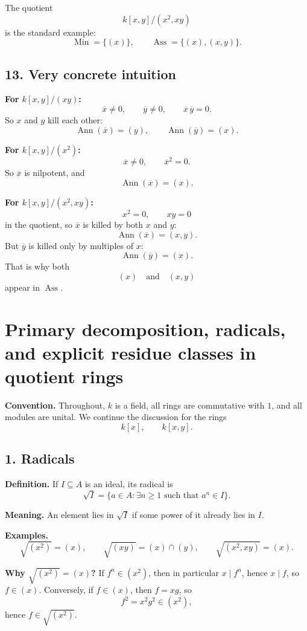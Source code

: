 \documentclass[12pt,a4paper]{article}
\theoremstyle{notespace}
\DeclareMathOperator{\Ass}{Ass}
\DeclareMathOperator{\Ann}{Ann}
\DeclareMathOperator{\Min}{Min}
\begin{document}
The quotient
\[
k[x,y]/(x^2,xy)
\]
is the standard example:
\[
\Min=\{(x)\},\qquad \Ass=\{(x),(x,y)\}.
\]

\subsection{13. Very concrete intuition}

\textbf{For \(k[x,y]/(xy)\):}
\[
\overline x\neq 0,\qquad \overline y\neq 0,\qquad \overline x\,\overline y=0.
\]
So \(x\) and \(y\) kill each other:
\[
\Ann(\overline x)=(y),\qquad \Ann(\overline y)=(x).
\]

\textbf{For \(k[x,y]/(x^2)\):}
\[
\overline x\neq 0,\qquad \overline x^2=0.
\]
So \(\overline x\) is nilpotent, and
\[
\Ann(\overline x)=(x).
\]

\textbf{For \(k[x,y]/(x^2,xy)\):}
\[
x^2=0,\qquad xy=0
\]
in the quotient, so \(\overline x\) is killed by both \(x\) and \(y\):
\[
\Ann(\overline x)=(x,y).
\]
But \(\overline y\) is killed only by multiples of \(x\):
\[
\Ann(\overline y)=(x).
\]
That is why both
\[
(x)\quad \text{and}\quad (x,y)
\]
appear in \(\Ass\).

\section{Primary decomposition, radicals, and explicit residue classes in quotient rings}

\textbf{Convention.}
Throughout, \(k\) is a field, all rings are commutative with \(1\), and all modules are unital.
We continue the discussion for the rings
\[
k[x],\qquad k[x,y].
\]

\subsection{1. Radicals}

\textbf{Definition.}
If \(I\subseteq A\) is an ideal, its radical is
\[
\sqrt{I}=\{a\in A:\exists n\ge 1\text{ such that }a^n\in I\}.
\]

\textbf{Meaning.}
An element lies in \(\sqrt I\) if some power of it already lies in \(I\).

\textbf{Examples.}
\[
\sqrt{(x^2)}=(x),\qquad \sqrt{(xy)}=(x)\cap(y),\qquad \sqrt{(x^2,xy)}=(x).
\]

\textbf{Why \(\sqrt{(x^2)}=(x)\)?}
If \(f^n\in (x^2)\), then in particular \(x\mid f^n\), hence \(x\mid f\), so \(f\in (x)\).
Conversely, if \(f\in (x)\), then \(f=xg\), so
\[
f^2=x^2g^2\in (x^2),
\]
hence \(f\in \sqrt{(x^2)}\).
\end{document}
